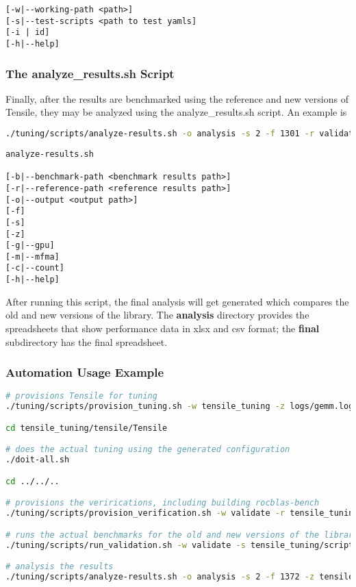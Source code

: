 \documentclass[]{article}
\begin{document}
\begin{verbatim}
[-w|--working-path <path>]
[-s|--test-scripts <path to test yamls]
[-i | id]
[-h|--help]
\end{verbatim}

\subsubsection{The analyze\_results.sh Script}

Finally, after the results are benchmarked using the reference and new versions of Tensile, they may be analyzed using the analyze\_results.sh script. An example is

\begin{lstlisting}[language=bash,breaklines=true]
./tuning/scripts/analyze-results.sh -o analysis -s 2 -f 1301 -r validate/rocblas/rocBLAS-reference/build/release/clients/staging/results -b validate/rocblas/rocBLAS-verify/build/release/clients/staging/results
\end{lstlisting}

\begin{verbatim}
analyze-results.sh

[-b|--benchmark-path <benchmark results path>]
[-r|--reference-path <reference results path>]
[-o|--output <output path>]
[-f]
[-s]
[-z]
[-g|--gpu]
[-m|--mfma]
[-c|--count]
[-h|--help]
\end{verbatim}

After running this script, the final analysis will get generated which compares the old and new versions of the library. The \textbf{analysis} directory provides the spreadsheets that show performance data in xlsx and csv format; the \textbf{final} subdirectory has the final spreadsheet.

\subsubsection{Automation Usage Example}

\begin{lstlisting}[language=bash,breaklines=true]
# provisions Tensile for tuning
./tuning/scripts/provision_tuning.sh -w tensile_tuning -z logs/gemm.log -o tf_inception.yaml -y sgemm -l vega20

cd tensile_tuning/tensile/Tensile

# does the actual tuning using the generated configuration
./doit-all.sh

cd ../../..

# provisions the verirications, including building rocblas-bench
./tuning/scripts/provision_verification.sh -w validate -r tensile_tuning/tensile/Tensile -l vega20

# runs the actual benchmarks for the old and new versions of the library
./tuning/scripts/run_validation.sh -w validate -s tensile_tuning/scripts

# analysis the results
./tuning/scripts/analyze-results.sh -o analysis -s 2 -f 1372 -z tensile_tuning/scripts/*-all.sh -r validate/rocblas/rocBLAS-reference/build/release/clients/staging/results1 -b validate/rocblas/rocBLAS-reference/build/release/clients/staging/results2
\end{lstlisting}
\end{document}
